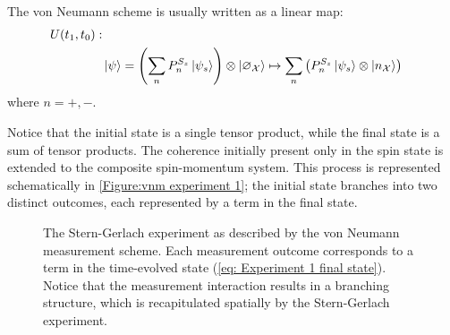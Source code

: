 The von Neumann scheme is usually written as a linear map:
\begin{align} \label{eq: general final state}
    \nonumber U(t_1, t_0): \\
    & \ket{\psi} = \left(\sum_{n} P^{S_z}_n\ket{\psi_s}\right) \otimes \ket{\varnothing_\mathcal{X}} \mapsto \sum_{n}\left(P^{S_z}_n\ket{\psi_s} \otimes \ket{n_\mathcal{X}}\right)
\end{align}
where $n = +, -$.

Notice that the initial state is a single tensor product, while the final state is a sum of tensor products. The coherence initially present only in the spin state is extended to the composite spin-momentum system. This process is represented schematically in \autoref{Figure:vnm experiment 1}; the initial state branches into two distinct outcomes, each represented by a term in the final state.

\begin{figure}
\centering\CaptionFontSize
{}

\caption[Insert an abbreviated caption here to show in the List of Figures]
{The Stern-Gerlach experiment as described by the von Neumann measurement scheme. Each measurement outcome corresponds to a term in the time-evolved state (\autoref{eq: Experiment 1 final state}). Notice that the measurement interaction results in a branching structure, which is recapitulated spatially by the Stern-Gerlach experiment.}
\label{Figure:vnm experiment 1}
\end{figure}

